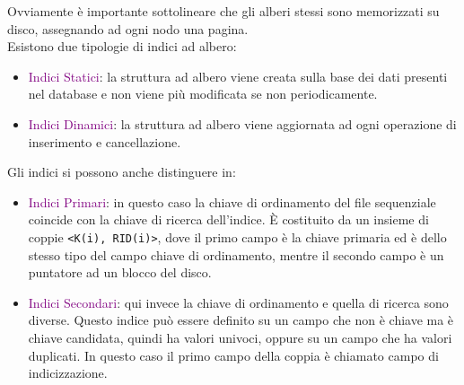 Ovviamente è importante sottolineare che gli alberi stessi sono memorizzati su disco,
assegnando ad ogni nodo una pagina. \\

Esistono due tipologie di indici ad albero:
\begin{itemize}
    \item \textcolor{purple}{Indici Statici}: la struttura ad albero viene creata sulla
        base dei dati presenti nel database e non viene più modificata se non periodicamente.
    \item \textcolor{purple}{Indici Dinamici}: la struttura ad albero viene aggiornata ad
        ogni operazione di inserimento e cancellazione.
\end{itemize}

Gli indici si possono anche distinguere in:
\begin{itemize}
    \item \textcolor{purple}{Indici Primari}: in questo caso la chiave di ordinamento del
        file sequenziale coincide con la chiave di ricerca dell'indice. È costituito da un insieme
        di coppie \verb|<K(i), RID(i)>|, dove il primo campo è la chiave primaria ed è dello stesso tipo
        del campo chiave di ordinamento, mentre il secondo campo è un puntatore ad un blocco del disco.
    \item \textcolor{purple}{Indici Secondari}: qui invece la chiave di ordinamento e quella
        di ricerca sono diverse. Questo indice può essere definito su un
        campo che non è chiave ma è chiave candidata, quindi ha valori univoci, oppure su un campo
        che ha valori duplicati. In questo caso il primo campo della coppia è chiamato campo di indicizzazione.
\end{itemize}